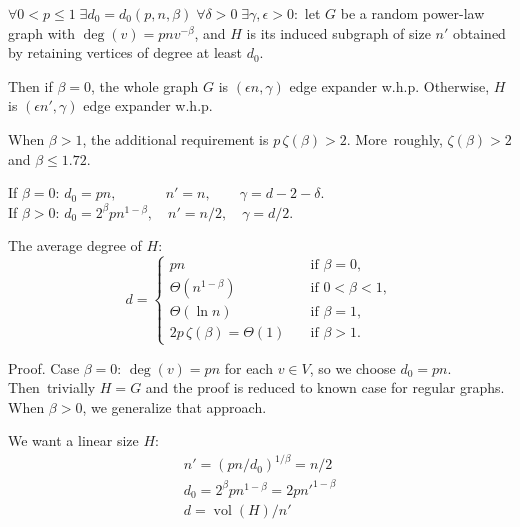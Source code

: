 \documentclass{beamer}
\DeclareMathOperator*{\vol}{vol}
\newcommand{\autotitle}{\secname\ifdefempty{\subsecname}{}{~--- \subsecname}}
\newcommand{\smalldisplayskips}{
    \setlength{\abovedisplayskip}{3pt}
    \setlength{\belowdisplayskip}{3pt}}
\begin{document}
\begin{frame}{\autotitle}
    \begin{theorem}
        $\forall 0<p\leq 1\;\exists d_0=d_0(p,n,\beta)\;\forall\delta>0\;\exists\gamma,\epsilon>0:$
        let $G$ be a random power-law graph with $\deg(v)=pnv^{-\beta}$,
        and $H$ is its induced subgraph of size $n'$ obtained by retaining vertices of degree at least $d_0$.
        
        Then if $\beta=0$, the whole graph $G$ is $(\epsilon n,\gamma)$ edge expander w.h.p.
        Otherwise, $H$ is $(\epsilon n',\gamma)$ edge expander w.h.p.
        
        When $\beta>1$, the additional requirement is $p\,\zeta(\beta)>2$.
        More~roughly, $\zeta(\beta)>2$ and $\beta\leq 1.72$.
    \end{theorem}
\end{frame}

\begin{frame}{\autotitle}
    \begin{theorem}[Cont.]
        \smalldisplayskips
        If $\beta=0$: $d_0=pn, \qquad\quad\;\, n'=n, \quad\;\;\;\,\gamma=d-2-\delta$.\\
        If $\beta>0$: $d_0=2^\beta pn^{1-\beta}, \quad n'=n/2, \quad\gamma=d/2$.

        The average degree of $H$:
        \begin{equation*}
            d=
            \begin{cases}
                pn & \quad \text{if } \beta=0,\\
                \Theta(n^{1-\beta}) & \quad \text{if } 0<\beta<1,\\
                \Theta(\ln n) & \quad \text{if } \beta=1,\\
                2p\,\zeta(\beta)=\Theta(1) & \quad \text{if } \beta>1.
            \end{cases}
        \end{equation*}
    \end{theorem}
\end{frame}

\begin{frame}{\autotitle}
    \smalldisplayskips
    \begin{block}{Proof.}
        Case $\beta=0$: $\deg(v)=pn$ for each $v\in V$, so we choose $d_0=pn$.
        Then~trivially $H=G$ and the proof is reduced to known case for regular graphs.
        When $\beta>0$, we generalize that approach.
        
        We want a linear size $H$:
        \begin{gather*}
            n'=(pn/d_0)^{1/\beta}=n/2\\
            d_0=2^\beta pn^{1-\beta}=2pn'^{1-\beta}\\
            d=\vol(H)/n'
        \end{gather*}
    \end{block}
\end{frame}
\end{document}
